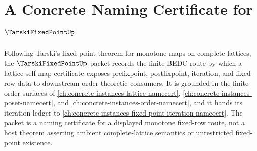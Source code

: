 \chapter{A Concrete Naming Certificate for $\TarskiFixedPointUp$}
\label{ch:concrete-instances-tarski-fixed-point-namecert}

Following Tarski's fixed point theorem for monotone maps on complete lattices, the $\TarskiFixedPointUp$ packet records the finite BEDC route by which a lattice self-map certificate exposes prefixpoint, postfixpoint, iteration, and fixed-row data to downstream order-theoretic consumers. It is grounded in the finite order surfaces of \autoref{ch:concrete-instances-lattice-namecert}, \autoref{ch:concrete-instances-poset-namecert}, and \autoref{ch:concrete-instances-order-namecert}, and it hands its iteration ledger to \autoref{ch:concrete-instances-fixed-point-iteration-namecert}. The packet is a naming certificate for a displayed monotone fixed-row route, not a host theorem asserting ambient complete-lattice semantics or unrestricted fixed-point existence.

